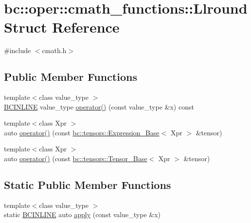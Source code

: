 \hypertarget{structbc_1_1oper_1_1cmath__functions_1_1Llround}{}\section{bc\+:\+:oper\+:\+:cmath\+\_\+functions\+:\+:Llround Struct Reference}
\label{structbc_1_1oper_1_1cmath__functions_1_1Llround}


{\ttfamily \#include $<$cmath.\+h$>$}

\subsection*{Public Member Functions}
\begin{DoxyCompactItemize}
\item 
{\footnotesize template$<$class value\+\_\+type $>$ }\\\hyperlink{common_8h_a6699e8b0449da5c0fafb878e59c1d4b1}{B\+C\+I\+N\+L\+I\+NE} value\+\_\+type \hyperlink{structbc_1_1oper_1_1cmath__functions_1_1Llround_ac483a61af1b65a6269fae307d5760963}{operator()} (const value\+\_\+type \&x) const
\item 
{\footnotesize template$<$class Xpr $>$ }\\auto \hyperlink{structbc_1_1oper_1_1cmath__functions_1_1Llround_aa39036776459f067146e04ad71159cb1}{operator()} (const \hyperlink{classbc_1_1tensors_1_1Expression__Base}{bc\+::tensors\+::\+Expression\+\_\+\+Base}$<$ Xpr $>$ \&tensor)
\item 
{\footnotesize template$<$class Xpr $>$ }\\auto \hyperlink{structbc_1_1oper_1_1cmath__functions_1_1Llround_a0b6262d9da5c0c9ef39fec5df46326ec}{operator()} (const \hyperlink{classbc_1_1tensors_1_1Tensor__Base}{bc\+::tensors\+::\+Tensor\+\_\+\+Base}$<$ Xpr $>$ \&tensor)
\end{DoxyCompactItemize}
\subsection*{Static Public Member Functions}
\begin{DoxyCompactItemize}
\item 
{\footnotesize template$<$class value\+\_\+type $>$ }\\static \hyperlink{common_8h_a6699e8b0449da5c0fafb878e59c1d4b1}{B\+C\+I\+N\+L\+I\+NE} auto \hyperlink{structbc_1_1oper_1_1cmath__functions_1_1Llround_a24418651286cf92222fe4d08edf78b0b}{apply} (const value\+\_\+type \&x)
\end{DoxyCompactItemize}



